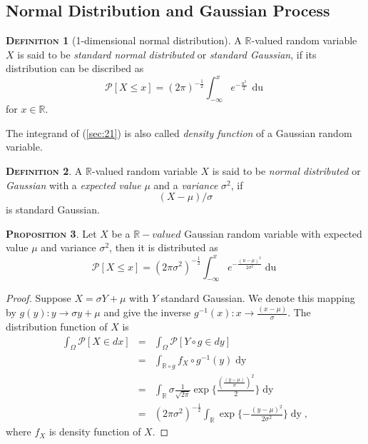 \documentclass[a4paper, twoside, 11pt]{article}
\theoremstyle{definition}
\newtheorem{definition}{\scshape Definition}[section]
\newtheorem{proposition}[definition]{\scshape Proposition}
\newcommand{\sqbr}[1]{\left[ {#1} \right]}
\begin{document}
\subsection{Normal Distribution and Gaussian Process}
\begin{definition}[1-dimensional normal distribution]
  A $\mathbb{R}$-valued random variable $X$ is said to be \emph{standard normal distributed} or \emph{standard Gaussian}, if its distribution can be discribed as
  \begin{equation}
	\mathcal{P}\sqbr{X \le x} = (2\pi)^{-\frac{1}{2}}\int_{-\infty}^{x} e^{-\frac{u^2}{2}}\,\mathop{du}  
	\label{sec:21}
  \end{equation}
  for $x \in \mathbb{R}$.
\end{definition}
The integrand of (\ref{sec:21}) is also called \emph{density function} of a Gaussian random variable.

\begin{definition}
  A $\mathbb{R}$-valued random variable $X$ is said to be \emph{normal distributed} or \emph{Gaussian} with a \emph{expected value} $\mu$ and a \emph{variance} $\sigma^2$, if
\[
  (X-\mu) / \sigma
\]
is standard Gaussian.
\end{definition}

\begin{proposition}
  Let $X$ be a $\mathbb{R}-valued$ Gaussian random variable with expected value $\mu$ and variance $\sigma^2$, then it is distributed as
  \begin{equation*}
	\mathcal{P}[X\le x] = (2\pi\sigma^2)^{-\frac{1}{2}}\int_{-\infty}^x e^{-\frac{(u-\mu)^2}{2\sigma^2}}\mathop{du}
  \end{equation*}
\end{proposition}

\begin{proof}
  Suppose $X = \sigma Y + \mu$ with $Y$ standard Gaussian. We denote this mapping by $g(y) : y \rightarrow \sigma y + \mu$ and give the inverse $g^{-1}(x) : x \rightarrow \frac{(x-\mu)}{\sigma}$. The distribution function of $X$ is 
  \begin{eqnarray*}
	\int_\Omega \mathcal{P}[X \in dx] &=& \int_\Omega \mathcal{P}[Y \circ g \in dy] \\
	&=& \int_{\mathbb{R}\circ g} f_X \circ g^{-1}(y) \mathop{dy}\\
	&=& \int_{\mathbb{R}} \sigma \frac{1}{\sqrt{2\pi}} \exp\{\frac{(\frac{(y-\mu)}{\sigma})^2}{2}\} \mathop{dy}\\
	&=&  (2\pi\sigma^2)^{-\frac{1}{2}}\int_{\mathbb{R}} \exp\{-\frac{(y-\mu)^2}{2\sigma^2}\}\mathop{dy} ,
  \end{eqnarray*}
 where $f_X$ is density function of $X$.
\end{proof}
\end{document}
